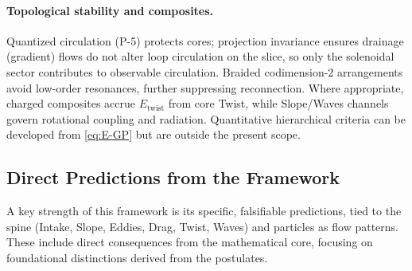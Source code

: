 \paragraph{Topological stability and composites.}
Quantized circulation (P-5) protects cores; projection invariance ensures drainage (gradient) flows do not alter loop circulation on the slice, so only the solenoidal sector contributes to observable circulation. Braided codimension-2 arrangements avoid low-order resonances, further suppressing reconnection. Where appropriate, charged composites accrue $E_{\text{twist}}$ from core Twist, while Slope/Waves channels govern rotational coupling and radiation. Quantitative hierarchical criteria can be developed from \eqref{eq:E-GP} but are outside the present scope.

\medskip
\noindent
{}
\medskip

\subsection{Direct Predictions from the Framework}

A key strength of this framework is its specific, falsifiable predictions, tied to the spine (Intake, Slope, Eddies, Drag, Twist, Waves) and particles as flow patterns. These include direct consequences from the mathematical core, focusing on foundational distinctions derived from the postulates.

